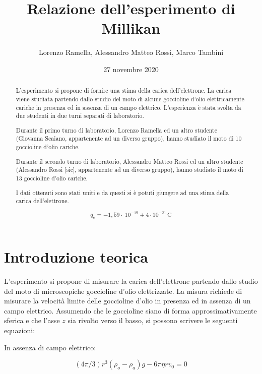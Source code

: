 \documentclass{article}
\title{Relazione dell'esperimento di Millikan}
\author{Lorenzo Ramella, Alessandro Matteo Rossi, Marco Tambini}
\date{27 novembre 2020}
\begin{document}
\maketitle

\begingroup
{}
\begin{abstract}
L’esperimento si propone di fornire una stima della carica dell’elettrone. La carica viene studiata partendo dallo studio del moto di alcune goccioline d’olio elettricamente cariche in presenza ed in assenza di un campo elettrico. L'esperienza è stata svolta da due studenti in due turni separati di laboratorio.


\vspace{4mm}

Durante il primo turno di laboratorio, Lorenzo Ramella ed un altro studente (Giovanna Scaiano, appartenente ad un diverso gruppo), hanno studiato il moto di 10 goccioline d’olio cariche. 

\vspace{4mm}

Durante il secondo turno di laboratorio, Alessandro Matteo Rossi ed un altro studente (Alessandro Rossi [sic], appartenente ad un diverso gruppo), hanno studiato il moto di 13 goccioline d’olio cariche. 

\vspace{4mm}

I dati ottenuti sono stati uniti e da questi si è potuti giungere ad una stima della carica dell'elettrone.

\[q_e = - 1,59 \cdot\ 10^{-19} \pm 4 \cdot 10^{-21} \, \textrm{C}\]

\end{abstract}
\endgroup

\tableofcontents

\section{Introduzione teorica}
L'esperimento si propone di misurare la carica dell'elettrone partendo dallo studio del moto di microscopiche goccioline d'olio elettrizzate. La misura richiede di misurare la velocità limite delle goccioline d'olio in presenza ed in assenza di un campo elettrico. Assumendo che le goccioline siano di forma approssimativamente sferica e che l'asse $z$ sia rivolto verso il basso, si possono scrivere le seguenti equazioni:

In assenza di campo elettrico:

\begin{equation}
(4 \pi /3)r^3 (\rho _o - \rho _a)g - 6\pi \eta r v_0=0 
\end{equation}
\end{document}
